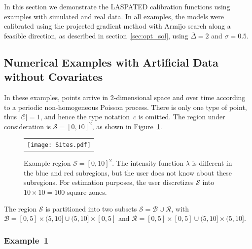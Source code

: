 \documentclass[article]{jss}
\begin{document}
In this section we demonstrate the LASPATED calibration functions using examples with simulated and real data.
In all examples, the models were calibrated using the projected gradient method with Armijo search along a feasible direction, as described in section~\ref{sec:opt_sol}, using $\overline{\Delta} = 2$ and $\sigma = 0.5$.


\subsection{Numerical Examples with Artificial Data without Covariates}
\label{sec:simulated example}

In these examples, points arrive in $2$-dimensional space and over time according to a periodic non-homogeneous Poisson process.
There is only one type of point, thus $|\mathcal{C}| = 1$, and hence the type notation~$c$ is omitted.
The region under consideration is $\mathcal{S} = [0,10]^2$, as shown in Figure~\ref{figureserr}. 

\begin{figure}
\centering
\begin{tabular}{c}
\texttt{[image: Sites.pdf]}
\end{tabular}
\caption{\label{figureserr}
Example region $\mathcal{S} = [0,10]^2$.
The intensity function $\lambda$ is different in the blue and red subregions, but the user does not know about these subregions.
For estimation purposes, the user discretizes $\mathcal{S}$ into $10 \times 10 = 100$ square zones.
}
\end{figure}

The region $\mathcal{S}$ is partitioned into two subsets $\mathcal{S} = \mathcal{B} \cup \mathcal{R}$, with $\mathcal{B} = [0,5] \times (5,10] \cup (5,10] \times [0,5]$ and $\mathcal{R} = [0,5] \times [0,5] \cup (5,10] \times (5,10]$.





\subsubsection{Example~1}
\label{sec:example 1}
\end{document}
